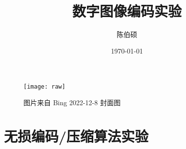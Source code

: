 \documentclass{myreport}
\title{数字图像编码实验}
\author{陈伯硕}
\date{\today}
\begin{document}
\maketitle

\begin{figure}[H]
  \centering
  \texttt{[image: raw]}
  \caption{图片来自 Bing 2022-12-8 封面图}
  \label{fig:fish}
\end{figure}

\section{无损编码/压缩算法实验}

\begin{appendices} %
  
  

\end{appendices}
\end{document}
